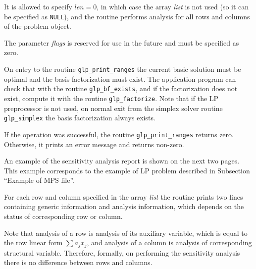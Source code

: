 It is allowed to specify $len=0$, in which case the array {\it list} is
not used (so it can be specified as \verb|NULL|), and the routine
performs analysis for all rows and columns of the problem object.

The parameter {\it flags} is reserved for use in the future and must be
specified as zero.

On entry to the routine \verb|glp_print_ranges| the current basic
solution must be optimal and the basis factorization must exist.
The application program can check that with the routine
\verb|glp_bf_exists|, and if the factorization does
not exist, compute it with the routine \verb|glp_factorize|. Note that
if the LP preprocessor is not used, on normal exit from the simplex
solver routine \verb|glp_simplex| the basis factorization always exists.

\returns

If the operation was successful, the routine \verb|glp_print_ranges|
returns zero. Otherwise, it prints an error message and returns
non-zero.


An example of the sensitivity analysis report is shown on the next two
pages. This example corresponds to the example of LP problem described
in Subsection ``Example of MPS file''.


For each row and column specified in the array {\it list} the routine
prints two lines containing generic information and analysis
information, which depends on the status of corresponding row or column.

Note that analysis of a row is analysis of its auxiliary variable,
which is equal to the row linear form $\sum a_jx_j$, and analysis of
a column is analysis of corresponding structural variable. Therefore,
formally, on performing the sensitivity analysis there is no difference
between rows and columns.

\newpage

